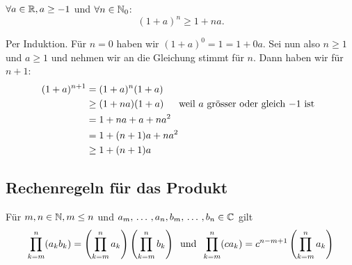 \begin{thm}
  $\forall a \in \mathbb{R}, a \geq -1$ und $\forall n \in \mathbb{N}_0$:
  \[(1+a)^n \geq 1 + na. \]
\end{thm}
\begin{prf}
  Per Induktion. Für $n=0$ haben wir $(1+a)^0 = 1 = 1 + 0a$. Sei nun also $n \geq 1$ und $a \geq 1$ und nehmen wir an die Gleichung stimmt für $n$. Dann haben wir für $n+1$:
  \[
  \begin{aligned}
    (1+a)^{n+1}
    &= (1+a)^n (1+a) \\
    &\geq (1+na)(1+a) \quad \;\; \text{weil $a$ grösser oder gleich $-1$ ist}\;\; \\
    &= 1+na+a+na^2 \\
    &= 1+ (n+1)a + na^2 \\
    &\geq 1 + (n+1)a
  \end{aligned}
  \]
  \vspace*{-\baselineskip}
\end{prf}

\subsection{Rechenregeln für das Produkt}
Für $m,n \in \mathbb{N}, m\leq n$ und $a_m, {\, \ldots \,\,}, a_n, b_m, {\, \ldots \,\,}, b_n \in \mathbb{C}$ gilt
\[
  \prod_{k=m}^{n} (a_k b_k) = \left(\prod_{k=m}^{n} a_k\right) \left(\prod_{k=m}^{n} b_k\right)
  \;\; \text{und}\;\;
  \prod_{k=m}^{n} (ca_k)=c^{n-m+1}\left(\prod_{k=m}^{n}a_k\right)
\]